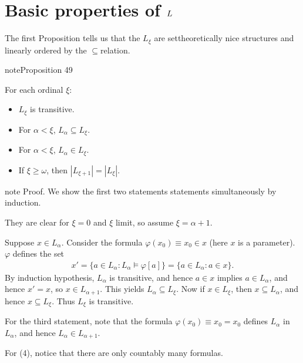\documentclass[letterpaper,10pt,english]{jupyterBook}
\begin{document}
\section{Basic properties of \protect\(L\protect\)}
\label{\detokenize{constructible:basic-properties-of-l}}
\sphinxAtStartPar
The first Proposition tells us that the \(L_\xi\) are set\sphinxhyphen{}theoretically nice structures and linearly ordered by the \(\subseteq\)\sphinxhyphen{}relation.
\label{constructible:prop-basics-L}
\begin{sphinxadmonition}{note}{Proposition 49}



\sphinxAtStartPar
For each ordinal \(\xi\):
\begin{itemize}
\item {} 
\sphinxAtStartPar
{} \(L_\xi\) is transitive.

\item {} 
\sphinxAtStartPar
{} For \(\alpha < \xi\), \(L_\alpha \subseteq L_\xi\).

\item {} 
\sphinxAtStartPar
{} For \(\alpha < \xi\), \(L_\alpha \in L_\xi\).

\item {} 
\sphinxAtStartPar
{} If \(\xi \geq \omega\), then \(|L_{\xi+1}| = |L_\xi|\).

\end{itemize}
\end{sphinxadmonition}

\begin{sphinxadmonition}{note}
\sphinxAtStartPar
Proof. We show the first two statements statements simultaneously by induction.

\sphinxAtStartPar
They are clear for \(\xi = 0\) and \(\xi\) limit, so assume \(\xi = \alpha +1\).

\sphinxAtStartPar
Suppose \(x \in L_\alpha\). Consider the formula \(\varphi(x_0) \equiv x_0 \in x\) (here \(x\) is a parameter). \(\varphi\) defines the set
\begin{equation*}
\begin{split}
    x' = \{a \in L_\alpha \colon L_\alpha \models \varphi[a] \} = \{ a \in L_\alpha \colon a \in x \}.  
\end{split}
\end{equation*}
\sphinxAtStartPar
By induction hypothesis, \(L_\alpha\) is transitive, and hence \(a \in x\) implies \(a \in L_\alpha\), and hence \(x' = x\), so \(x \in L_{\alpha+1}\). This yields \(L_\alpha \subseteq L_\xi\). Now if \(x \in L_\xi\), then \(x \subseteq L_\alpha\), and hence \(x \subseteq L_\xi\). Thus \(L_\xi\) is transitive.

\sphinxAtStartPar
For the third statement, note that the formula \(\varphi(x_0) \equiv x_0 = x_0\) defines \(L_\alpha\) in \(L_\alpha\), and hence \(L_\alpha \in L_{\alpha + 1}\).

\sphinxAtStartPar
For (4), notice that there are only countably many formulas.
\end{sphinxadmonition}
\end{document}
